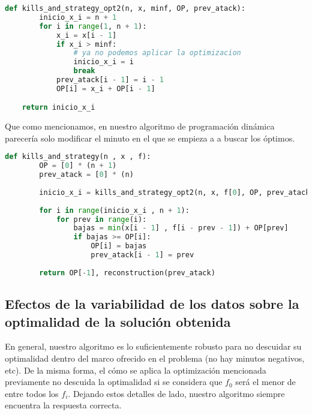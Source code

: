 \begin{lstlisting}[language=Python]
    def kills_and_strategy_opt2(n, x, minf, OP, prev_atack):
        inicio_x_i = n + 1
        for i in range(1, n + 1):
            x_i = x[i - 1]
            if x_i > minf:
                # ya no podemos aplicar la optimizacion
                inicio_x_i = i
                break
            prev_atack[i - 1] = i - 1
            OP[i] = x_i + OP[i - 1]

    return inicio_x_i
\end{lstlisting}
Que como mencionamos, en nuestro algoritmo de programación dinámica parecería solo modificar el minuto en el que se empieza a a buscar los óptimos. 
\begin{lstlisting}[language=Python]
    def kills_and_strategy(n , x , f):
        OP = [0] * (n + 1)
        prev_atack = [0] * (n)
    
        inicio_x_i = kills_and_strategy_opt2(n, x, f[0], OP, prev_atack)
    
        for i in range(inicio_x_i , n + 1):
            for prev in range(i):
                bajas = min(x[i - 1] , f[i - prev - 1]) + OP[prev]
                if bajas >= OP[i]:
                    OP[i] = bajas
                    prev_atack[i - 1] = prev
                    
        return OP[-1], reconstruction(prev_atack)
\end{lstlisting}
\subsection{Efectos de la variabilidad de los datos sobre la optimalidad de la solución obtenida} 
En general, nuestro algoritmo es lo suficientemente robusto para no descuidar su optimalidad dentro del marco ofrecido en el problema (no hay minutos negativos, etc). De la misma forma, el cómo se aplica la optimización mencionada previamente no descuida la optimalidad si se considera que $f_0$ será el menor de entre todos los $f_i$. Dejando estos detalles de lado, nuestro algoritmo siempre encuentra la respuesta correcta.

\newpage
